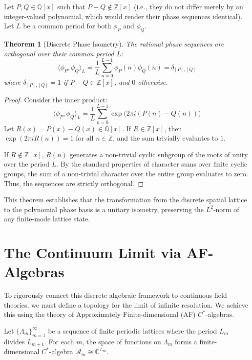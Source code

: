 \documentclass[11pt,a4paper]{article}
\newtheorem{theorem}{Theorem}[section]
\begin{document}
Let $P, Q \in \mathbb{Q}[x]$ such that $P - Q \notin \mathbb{Z}[x]$ (i.e., they do not differ merely by an integer-valued polynomial, which would render their phase sequences identical). Let $L$ be a common period for both $\phi_P$ and $\phi_Q$.

\begin{theorem}[Discrete Phase Isometry]
\label{thm:isometry}
The rational phase sequences are orthogonal over their common period $L$:
\begin{equation}
\langle \phi_P, \phi_Q \rangle_L = \frac{1}{L} \sum_{n=0}^{L-1} \phi_P(n) \overline{\phi_Q(n)} = \delta_{[P], [Q]}
\end{equation}
where $\delta_{[P], [Q]} = 1$ if $P - Q \in \mathbb{Z}[x]$, and $0$ otherwise.
\end{theorem}
\begin{proof}
Consider the inner product:
\begin{equation}
\langle \phi_P, \phi_Q \rangle_L = \frac{1}{L} \sum_{n=0}^{L-1} \exp\big(2\pi i (P(n) - Q(n))\big)
\end{equation}
Let $R(x) = P(x) - Q(x) \in \mathbb{Q}[x]$. If $R \in \mathbb{Z}[x]$, then $\exp(2\pi i R(n)) = 1$ for all $n \in \mathbb{Z}$, and the sum trivially evaluates to $1$. 

If $R \notin \mathbb{Z}[x]$, $R(n)$ generates a non-trivial cyclic subgroup of the roots of unity over the period $L$. By the standard properties of character sums over finite cyclic groups, the sum of a non-trivial character over the entire group evaluates to zero. Thus, the sequences are strictly orthogonal.
\end{proof}

This theorem establishes that the transformation from the discrete spatial lattice to the polynomial phase basis is a unitary isometry, preserving the $L^2$-norm of any finite-mode lattice state.

\section{The Continuum Limit via AF-Algebras}

To rigorously connect this discrete algebraic framework to continuous field theories, we must define a topology for the limit of infinite resolution. We achieve this using the theory of Approximately Finite-dimensional (AF) $C^*$-algebras.

Let $\{\Lambda_m\}_{m=1}^\infty$ be a sequence of finite periodic lattices where the period $L_m$ divides $L_{m+1}$. For each $m$, the space of functions on $\Lambda_m$ forms a finite-dimensional $C^*$-algebra $\mathcal{A}_m \cong \mathbb{C}^{L_m}$.
\end{document}
